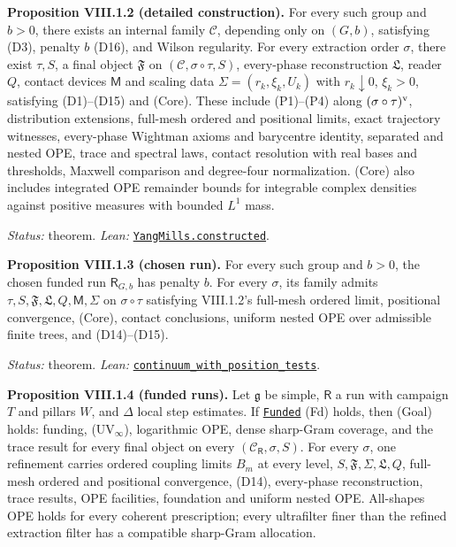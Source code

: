 \documentclass[
  letterpaper,
  11pt]{article}
\begin{document}
\textbf{Proposition VIII.1.2 (detailed construction).} For every such
group and \(b>0\), there exists an internal family \(\mathcal C\),
depending only on \((G,b)\), satisfying (D3), penalty \(b\) (D16), and
Wilson regularity. For every extraction order \(\sigma\), there exist
\(\tau,S\), a final object \(\mathfrak F\) on
\((\mathcal C,\sigma\circ\tau,S)\), every-phase reconstruction
\(\mathfrak L\), reader \(Q\), contact devices \(\mathsf M\) and scaling
data \(\Sigma=(r_k,\xi_k,U_k)\) with \(r_k\downarrow0\), \(\xi_k>0\),
satisfying (D1)--(D15) and (Core). These include (P1)--(P4) along
\((\sigma\circ\tau)^{\rm v}\), distribution extensions, full-mesh
ordered and positional limits, exact trajectory witnesses, every-phase
Wightman axioms and barycentre identity, separated and nested OPE, trace
and spectral laws, contact resolution with real bases and thresholds,
Maxwell comparison and degree-four normalization. (Core) also includes
integrated OPE remainder bounds for integrable complex densities against
positive measures with bounded \(L^1\) mass.

\emph{Status:} theorem. \emph{Lean:}
\href{https://github.com/yang-mills-group/OpenAI-YM-20261028/blob/3456e5e75cf8d4cd558955a5c7638fba2d68f464/Construction.lean\#L15-L40}{\texttt{YangMills.constructed}}.

\textbf{Proposition VIII.1.3 (chosen run).} For every such group and
\(b>0\), the chosen funded run \(\mathsf R_{G,b}\) has penalty \(b\).
For every \(\sigma\), its family admits
\(\tau,S,\mathfrak F,\mathfrak L,Q,\mathsf M,\Sigma\) on
\(\sigma\circ\tau\) satisfying VIII.1.2's full-mesh ordered limit,
positional convergence, (Core), contact conclusions, uniform nested OPE
over admissible finite trees, and (D14)--(D15).

\emph{Status:} theorem. \emph{Lean:}
\href{https://github.com/yang-mills-group/OpenAI-YM-20261028/blob/3456e5e75cf8d4cd558955a5c7638fba2d68f464/YM/Nonperturbative/Continuum.lean\#L28-L48}{\texttt{continuum\_with\_position\_tests}}.

\textbf{Proposition VIII.1.4 (funded runs).} Let \(\mathfrak g\) be
simple, \(\mathsf R\) a run with campaign \(T\) and pillars \(W\), and
\(\Delta\) local step estimates. If
\href{https://github.com/yang-mills-group/OpenAI-YM-20261028/blob/3456e5e75cf8d4cd558955a5c7638fba2d68f464/YM/R2I/Campaign/Accepted.lean\#L60-L73}{\texttt{Funded}}
(Fd) holds, then (Goal) holds: funding, (UV\(_\infty\)), logarithmic
OPE, dense sharp-Gram coverage, and the trace result for every final
object on every \((\mathcal C_{\mathsf R},\sigma,S)\). For every
\(\sigma\), one refinement carries ordered coupling limits \(B_m\) at
every level, \(S,\mathfrak F,\Sigma,\mathfrak L,Q\), full-mesh ordered
and positional convergence, (D14), every-phase reconstruction, trace
results, OPE facilities, foundation and uniform nested OPE. All-shapes
OPE holds for every coherent prescription; every ultrafilter finer than
the refined extraction filter has a compatible sharp-Gram allocation.
\end{document}
